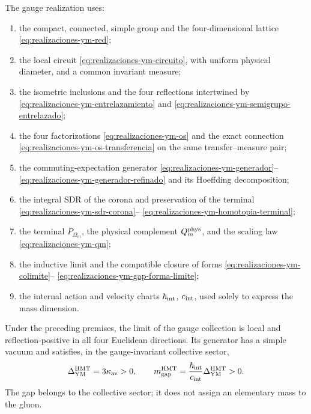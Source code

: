 The gauge realization uses:
\begin{enumerate}
 \item the compact, connected, simple group and the four-dimensional lattice
       \eqref{eq:realizaciones-ym-red};
 \item the local circuit \eqref{eq:realizaciones-ym-circuito}, with uniform
       physical diameter, and a common invariant measure;
 \item the isometric inclusions and the four reflections intertwined by
       \eqref{eq:realizaciones-ym-entrelazamiento} and
       \eqref{eq:realizaciones-ym-semigrupo-entrelazado};
 \item the four factorizations
       \eqref{eq:realizaciones-ym-os} and the exact connection
       \eqref{eq:realizaciones-ym-os-transferencia} on the same
       transfer--measure pair;
 \item the commuting-expectation generator
       \eqref{eq:realizaciones-ym-generador}--
       \eqref{eq:realizaciones-ym-generador-refinado} and its
       Hoeffding decomposition;
 \item the integral SDR of the corona and preservation of the terminal
       \eqref{eq:realizaciones-ym-sdr-corona}--
       \eqref{eq:realizaciones-ym-homotopia-terminal};
 \item the terminal \(P_{\Omega_m}\), the physical complement
       \(Q_m^{\rm phys}\), and the scaling law
       \eqref{eq:realizaciones-ym-qm};
 \item the inductive limit and the compatible closure of forms
       \eqref{eq:realizaciones-ym-colimite}--
       \eqref{eq:realizaciones-ym-gap-forma-limite};
 \item the internal action and velocity charts
       \(\hbar_{\rm int}\), \(c_{\rm int}\), used solely to express the
       mass dimension.
\end{enumerate}

\begin{theorem}
\label{thm:realizaciones-ym}
Under the preceding premises, the limit of the gauge collection is local and
reflection-positive in all four Euclidean directions. Its generator
has a simple vacuum and satisfies, in the gauge-invariant collective sector,
\begin{equation}\label{eq:realizaciones-ym-gap-limite}
 \Delta_{\rm YM}^{\rm HMT}=3\kappa_{\rm av}>0,
 \qquad
 m_{\rm gap}^{\rm HMT}
 =\frac{\hbar_{\rm int}}{c_{\rm int}}
  \Delta_{\rm YM}^{\rm HMT}>0.
\end{equation}
The gap belongs to the collective sector; it does not assign an elementary mass to the
gluon.
\end{theorem}

